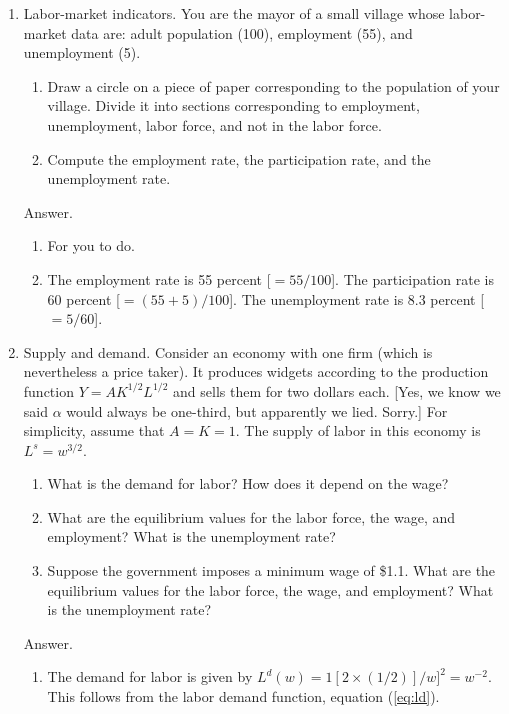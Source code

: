 \setlength{\leftmargini}{.5\oldleftmargini}
\begin{enumerate}
\item Labor-market indicators.
You are the mayor of a small village whose
labor-market data are: adult population (100), employment (55), and
unemployment (5).
\begin{enumerate}
\item Draw a circle on a piece of paper corresponding to the
population of your village. Divide it into sections corresponding
to employment, unemployment, labor force, and not in the labor
force.

\item Compute the employment rate, the participation rate, and the unemployment rate.
\end{enumerate}

Answer.
\begin{enumerate}
\item For you to do.

\item The employment rate is 55 percent [$= 55/100$].
The participation rate is 60 percent [$= (55+5)/100$].
The unemployment rate is 8.3 percent [$= 5/60$].
\end{enumerate}

\item Supply and demand. Consider an economy with one firm (which
is nevertheless a price taker).  It produces widgets according to
the production function $Y = A K^{1/2}L^{1/2}$ and sells them for
two dollars each.
[Yes, we know we said $\alpha$ would always be one-third,
but apparently we lied.  Sorry.]
For simplicity, assume that $A = K = 1$.  The
supply of labor in this economy is $L^{s}=w^{3/2}$.
%
\begin{enumerate}
\item What is the demand for labor?  How does it depend on the wage?

\item What are the equilibrium values for the labor force, the
wage, and employment? What is the unemployment rate?

\item Suppose the government imposes a minimum wage of \$1.1. What
are the equilibrium values for the labor force, the wage, and
employment? What is the unemployment rate?
\end{enumerate}

Answer.
%
\begin{enumerate}
\item The demand for labor is given by $L^{d}(w) = 1 [ 2 \times
(1/2)]/{w}]^{2} = w^{-2}$.
This follows from the labor demand function, equation (\ref{eq:ld}).


\end{enumerate}
\end{enumerate}
